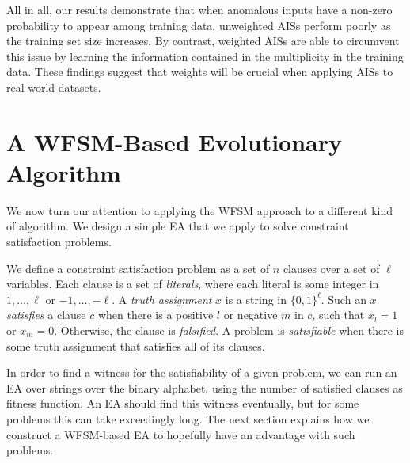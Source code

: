 \documentclass{llncs}
\begin{document}
All in all, our results demonstrate that when anomalous inputs have a non-zero probability
to appear among training data, unweighted AISs perform poorly as the training set size 
increases. By contrast, weighted AISs are able to circumvent this issue by learning 
the information contained in the multiplicity in the training data. These findings 
suggest that weights will be crucial when applying AISs to real-world datasets.

\section{A WFSM-Based Evolutionary Algorithm}
\label{fartheststring}

We now turn our attention to applying the WFSM approach to a different
kind of algorithm.
We design a simple EA that we apply to solve
constraint satisfaction problems.



We define a constraint satisfaction problem as a set of $n$ clauses
over a set of $\ell$ variables.
Each clause is a set of \emph{literals},
where each literal is some integer in
$1, \ldots, \ell$ or $-1, \ldots, -\ell$.
A \emph{truth assignment} $x$ is a string in $\{0,1\}^\ell$.
Such an $x$ \emph{satisfies} a clause $c$ when there is a positive $l$
or negative $m$ in $c$, such that $x_l=1$ or $x_m=0$.
Otherwise, the clause is \emph{falsified}.
A problem is \emph{satisfiable} when there is some truth assignment that
satisfies all of its clauses.

In order to find a witness for the satisfiability of a given problem,
we can run an EA over strings over the binary alphabet,
using the number of satisfied clauses as fitness function.
An EA should find this witness eventually,
but for some problems this can take exceedingly long.
The next section explains how we construct a WFSM-based EA
to hopefully have an advantage with such problems.
\end{document}
